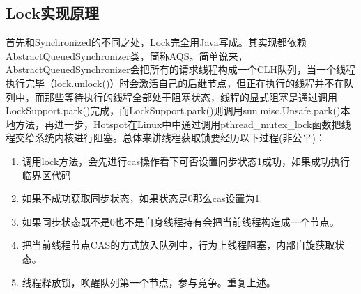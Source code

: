\documentclass[../../../interview-questions.tex]{subfiles}
\begin{document}
\subsection{Lock实现原理}

首先和Synchronized的不同之处，Lock完全用Java写成。其实现都依赖AbstractQueuedSynchronizer类，简称AQS。简单说来，AbstractQueuedSynchronizer会把所有的请求线程构成一个CLH队列，当一个线程执行完毕（lock.unlock()）时会激活自己的后继节点，但正在执行的线程并不在队列中，而那些等待执行的线程全部处于阻塞状态，线程的显式阻塞是通过调用LockSupport.park()完成，而LockSupport.park()则调用sun.misc.Unsafe.park()本地方法，再进一步，Hotspot在Linux中中通过调用pthread\_mutex\_lock函数把线程交给系统内核进行阻塞。总体来讲线程获取锁要经历以下过程(非公平)：    

\begin{enumerate}
    \item {调用lock方法，会先进行cas操作看下可否设置同步状态1成功，如果成功执行临界区代码}
    \item {如果不成功获取同步状态，如果状态是0那么cas设置为1.}
    \item {如果同步状态既不是0也不是自身线程持有会把当前线程构造成一个节点。}
    \item {把当前线程节点CAS的方式放入队列中，行为上线程阻塞，内部自旋获取状态。}
    \item {线程释放锁，唤醒队列第一个节点，参与竞争。重复上述。}
\end{enumerate}
\end{document}
